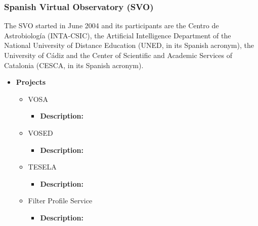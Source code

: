 \subsubsection{Spanish Virtual Observatory (SVO)}
The SVO started in June 2004 and its participants are the Centro de
Astrobiolog\'{i}a (INTA-CSIC), the Artificial Intelligence Department of the
National University of Distance Education (UNED, in its Spanish acronym), the
University of C\'{a}diz and the Center of Scientific and Academic Services of
Catalonia (CESCA, in its Spanish acronym).

\begin{itemize}
	\item \textbf{Projects}
	\begin{itemize}
		\item VOSA
			\begin{itemize}
				\item \textbf{Description:}
			\end{itemize}
		\item VOSED
			\begin{itemize}
				\item \textbf{Description:}
			\end{itemize}
		\item TESELA
			\begin{itemize}
				\item \textbf{Description:}
			\end{itemize}
		\item Filter Profile Service
			\begin{itemize}
				\item \textbf{Description:}
			\end{itemize}
	\end{itemize}
\end{itemize}


